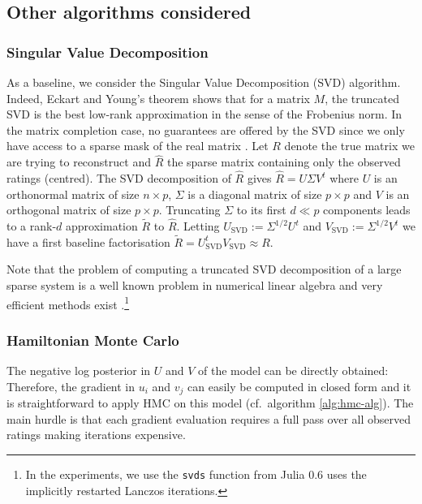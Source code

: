 

\subsection{Other algorithms considered}

\subsubsection{Singular Value Decomposition}

As a baseline, we consider the Singular Value Decomposition (SVD) algorithm. Indeed, Eckart and Young's theorem shows that for a matrix $M$, the truncated SVD is the best low-rank approximation in the sense of the Frobenius norm. In the matrix completion case, no guarantees are offered by the SVD since we only have access to a sparse mask of the real matrix \citep{srebro04}. Let $R$ denote the true matrix we are trying to reconstruct and $\hat R$ the sparse matrix containing only the observed ratings (centred). The SVD decomposition of $\hat R$ gives $\hat R = U\Sigma V^{t}$ where $U$ is an orthonormal matrix of size $n\times p$, $\Sigma$ is a diagonal matrix of size $p\times p$ and $V$ is an orthogonal matrix of size $p\times p$. Truncating $\Sigma$ to its first $d\ll p$ components leads to a rank-$d$ approximation $\tilde R$ to $\hat R$. 
Letting $U_{\text{SVD}}:=\Sigma^{1/2}U^{t}$ and $V_{\text{SVD}}:=\Sigma^{1/2}V^{t}$ we have a first baseline factorisation $\tilde R=U_{\text{SVD}}^{t}V_{\text{SVD}}\approx R$.

Note that the problem of computing a truncated SVD decomposition of a large sparse system is a well known problem in numerical linear algebra and very efficient methods exist \citep{sorensen96}.\footnote{In the experiments, we use the \texttt{svds} function from Julia 0.6 uses the implicitly restarted Lanczos iterations.} 

\subsubsection{Hamiltonian Monte Carlo}

The negative log posterior in $U$ and $V$ of the model can be directly obtained:
Therefore, the gradient in $u_{i}$ and $v_{j}$ can easily be computed in closed form and it is straightforward to apply HMC on this model (cf.\ algorithm \ref{alg:hmc-alg}). The main hurdle is that each gradient evaluation requires a full pass over all observed ratings making iterations expensive. 

